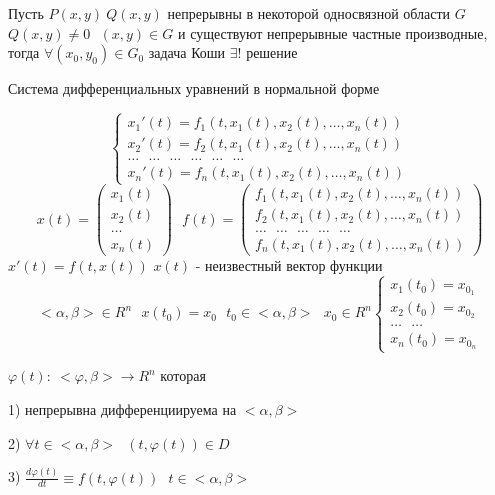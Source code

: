 \begin{theorem}
  Пусть $P(x, y) ~ Q(x, y)$ непрерывны в некоторой односвязной области $G$
  $Q(x, y) \not= 0 ~~~ (x,y) \in G$ и существуют непрерывные частные
  производные, тогда $\forall (x_0, y_0) \in G_0$ задача Коши
  $\exists !$ решение
\end{theorem}

\begin{title}
  Система дифференциальных уравнений в нормальной форме
\end{title}

\begin{define}
  $$
  \left\{
  \begin{array}{l}
    x_1'(t) = f_1(t, x_1(t), x_2(t), \ldots, x_n(t)) \\
    x_2'(t) = f_2(t, x_1(t), x_2(t), \ldots, x_n(t)) \\
    \ldots ~~~ \ldots ~~~ \ldots ~~~ \ldots ~~~ \ldots ~~~ \ldots \\
    x_n'(t) = f_n(t, x_1(t), x_2(t), \ldots, x_n(t))
  \end{array}
  \right.
  $$
  $$
  x(t) =
  \left(
  \begin{array}{l}
    x_1(t) \\
    x_2(t) \\
    \ldots \\
    x_n(t)
  \end{array}
  \right) ~~~
  f(t) =
  \left(
  \begin{array}{l}
   f_1(t, x_1(t), x_2(t), \ldots, x_n(t)) \\
   f_2(t, x_1(t), x_2(t), \ldots, x_n(t)) \\
    \ldots ~~~ \ldots ~~~ \ldots ~~~ \ldots ~~~ \ldots \\
   f_n(t, x_1(t), x_2(t), \ldots, x_n(t))
  \end{array}
  \right)
  $$
  $x'(t) = f(t, x(t))$ $x(t)$ - неизвестный вектор функции
  $$
  <\alpha, \beta> \in R^n ~~~ x(t_0) = x_0 ~~~ t_0 \in <\alpha, \beta> ~~~
  x_0 \in R^n
  \left\{
  \begin{array}{l}
    x_1(t_0) = x_{0_1} \\
    x_2(t_0) = x_{0_2} \\
    \ldots ~~~ \ldots \\
    x_n(t_0) = x_{0_n}
  \end{array}
  \right.
  $$
\end{define}

\begin{block}
  $\varphi(t): ~ <\varphi, \beta> \to R^n$ которая

  1) непрерывна дифференциируема на $<\alpha, \beta>$

  2) $\forall t \in <\alpha, \beta> ~~~ (t, \varphi(t)) \in D$

  3) $\frac{d\varphi(t)}{dt} \equiv f(t, \varphi(t)) ~~~
  t \in <\alpha, \beta>$
\end{block}

